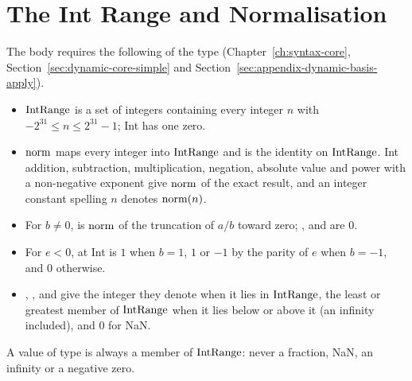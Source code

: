 \section{The Int Range and Normalisation}\label{sec:appendix-implementation-int}

The body requires the following of the type 
(Chapter~\ref{ch:syntax-core}, Section~\ref{sec:dynamic-core-simple} and
Section~\ref{sec:appendix-dynamic-basis-apply}).
\begin{itemize}
\item $\mathrm{IntRange}$ is a set of integers containing every integer $n$ with
  $-2^{31}\leq n\leq 2^{31}-1$; Int has one zero. %
\item $\mathrm{norm}$ maps every integer into $\mathrm{IntRange}$ and is the identity on
  $\mathrm{IntRange}$. Int addition, subtraction, multiplication, negation, absolute
  value and power with a non-negative exponent give $\mathrm{norm}$ of the exact
  result, and an integer constant spelling $n$ denotes $\mathrm{norm}(n)$. %
\item For $b\neq 0$,  is $\mathrm{norm}$ of the truncation of $a/b$ toward
  zero; ,  and  are $0$.
\item For $e<0$,  at Int is $1$ when $b=1$, $1$ or
  $-1$ by the parity of $e$ when $b=-1$, and $0$ otherwise. %
\item {}, ,  and  give the integer
  they denote when it lies in $\mathrm{IntRange}$, the least or greatest member of
  $\mathrm{IntRange}$ when it lies below or above it (an infinity included), and $0$
  for NaN. %
\end{itemize}
A value of type  is always a member of $\mathrm{IntRange}$: never a fraction,
NaN, an infinity or a negative zero.

